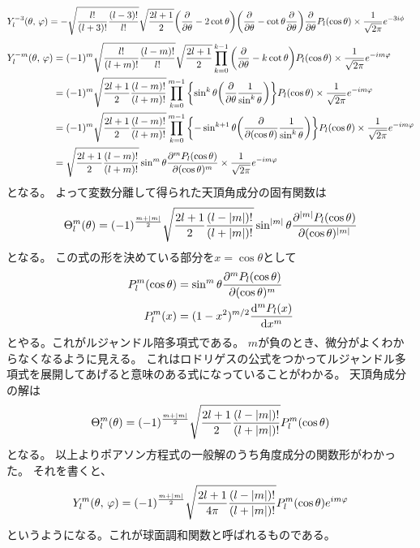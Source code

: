 \documentclass[../master.tex]{subfiles}
\begin{document}
\begin{equation}\begin{aligned}[b]
    Y_l^{-3}(\theta,\,\varphi)
	 & =-\sqrt{\frac{l!}{(l+3)!}\frac{(l-3)!}{l!}}\sqrt{\frac{2l+1}{2}}\qty(\pdv{\theta}-2\cot\theta)\qty(\pdv{\theta}-\cot\theta\pdv{\theta})\pdv{\theta}P_l(\cos\theta)\times\frac{1}{\sqrt{2\pi}}e^{-3i\phi}
\end{aligned}\end{equation}
\begin{equation}\begin{aligned}[b]
    Y_l^{-m}(\theta,\,\varphi)
	 & =(-1)^m\sqrt{\frac{l!}{(l+m)!}\frac{(l-m)!}{l!}}\sqrt{\frac{2l+1}{2}} \prod_{k=0}^{k-1}\qty(\pdv{\theta}-k\cot\theta)P_l(\cos\theta)\times\frac{1}{\sqrt{2\pi}}e^{-im\varphi}                    \\
	 & =(-1)^m\sqrt{\frac{2l+1}{2}\frac{(l-m)!}{(l+m)!}} \prod_{k=0}^{m-1}\qty{\sin^k\theta\qty(\pdv{\theta}\frac{1}{\sin^k\theta})}P_l(\cos\theta)\times\frac{1}{\sqrt{2\pi}}e^{-im\varphi}            \\
	 & =(-1)^m\sqrt{\frac{2l+1}{2}\frac{(l-m)!}{(l+m)!}} \prod_{k=0}^{m-1}\qty{-\sin^{k+1}\theta\qty(\pdv{(\cos\theta)}\frac{1}{\sin^k\theta})}P_l(\cos\theta)\times\frac{1}{\sqrt{2\pi}}e^{-im\varphi} \\
	 & =\sqrt{\frac{2l+1}{2}\frac{(l-m)!}{(l+m)!}} \sin^{m}\theta\pdv[m]{P_l(\cos\theta)}{(\cos\theta)}\times\frac{1}{\sqrt{2\pi}}e^{-im\varphi}
\end{aligned}\end{equation}
となる。
よって変数分離して得られた天頂角成分の固有関数は
\begin{equation}
	\Theta_l^m(\theta) = (-1)^{\frac{m+\abs{m}}{2}}\sqrt{\frac{2l+1}{2}\frac{(l-\abs{m})!}{(l+\abs{m})!}} \sin^{\abs{m}}\theta\pdv[\abs{m}]{P_l(\cos\theta)}{(\cos\theta)}
\end{equation}
となる。
この式の形を決めている部分を\(x=\cos\theta\)として
\begin{align}
	P_l^m(\cos\theta) &= \sin^m\theta\pdv[m]{P_l(\cos\theta)}{(\cos\theta)}\\
	P_l^m(x) &=(1-x^2)^{m/2}\dv[m]{P_l(x)}{x}
\end{align}
とやる。これがルジャンドル陪多項式である。
\(m\)が負のとき、微分がよくわからなくなるように見える。
これはロドリゲスの公式をつかってルジャンドル多項式を展開してあげると意味のある式になっていることがわかる。
天頂角成分の解は
\begin{equation}
	\Theta_l^m(\theta) = (-1)^{\frac{m+\abs{m}}{2}}\sqrt{\frac{2l+1}{2}\frac{(l-\abs{m})!}{(l+\abs{m})!}} P_l^{m}(\cos\theta)
\end{equation}
となる。
以上よりポアソン方程式の一般解のうち角度成分の関数形がわかった。
それを書くと、
\begin{equation}
	Y_l^m(\theta,\,\varphi) = (-1)^{\frac{m+\abs{m}}{2}}\sqrt{\frac{2l+1}{4\pi}\frac{(l-\abs{m})!}{(l+\abs{m})!}}P_l^{m}(\cos\theta)e^{im\varphi}
\end{equation}
というようになる。これが球面調和関数と呼ばれるものである。
\end{document}
